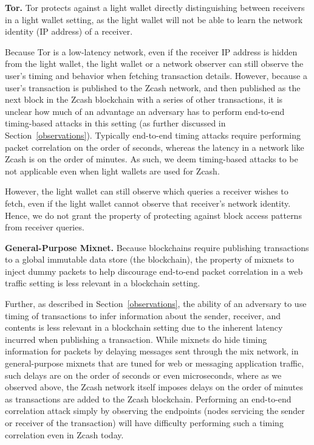 \documentclass{article}
\begin{document}
\textbf{Tor.}
Tor protects against a light wallet directly distinguishing between receivers
in a light wallet setting, as the light wallet will not be able to learn the
network identity (IP address) of a receiver.

Because Tor is a low-latency
network, even if the receiver IP address is hidden from the light wallet, the
light wallet or a network observer can still observe the user's timing and
behavior when fetching transaction details. However, because a user's
transaction is published to the Zcash network, and then published as the next
block in the Zcash blockchain with a series of other transactions, it is
unclear how much of an advantage an adversary has to perform end-to-end
timing-based attacks in this setting (as further discussed in
Section~\ref{observations}). Typically end-to-end timing attacks
require performing packet correlation on the order of seconds, whereas the
latency in a network like Zcash is on the order of minutes. As such, we deem
timing-based attacks to be not applicable even when light wallets are used for
Zcash.

However, the light wallet can still observe which queries a receiver wishes to
fetch, even if the light wallet cannot observe that receiver's network
identity.
Hence, we do not grant the property of protecting against
block access patterns from receiver queries.

\textbf{General-Purpose Mixnet.}
Because blockchains require publishing transactions to a global immutable data
store (the blockchain), the property of mixnets to inject dummy packets to help
discourage end-to-end packet correlation in a web traffic setting is less
relevant in a blockchain setting.

Further, as described in Section~\ref{observations}, the ability of an adversary to use timing of
transactions to infer information about the sender, receiver, and
contents is less relevant in a blockchain setting due to the inherent latency
incurred when publishing a transaction.
While mixnets do hide timing information for packets by
delaying messages sent through the mix network, in general-purpose mixnets that
are tuned for web or
messaging application traffic, such
delays are on the order of seconds or even microseconds, where as we observed
above, the Zcash network itself imposes delays on the order of minutes as
transactions are added to the Zcash blockchain. Performing an end-to-end
correlation attack simply by observing the endpoints (nodes servicing the
sender or receiver of the transaction) will have difficulty performing such a
timing correlation even in Zcash today.
\end{document}
